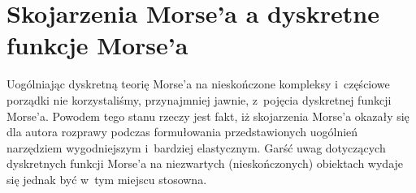 \begin{comment}
Dzięki twierdzeniu \ref{reversing_tw2} oczywisty jest następujący wniosek.
\begin{wn}
Jeśli na regularnym, lokalnie skończonym CW kompleksie $X$~zadane jest skojarzenie Morse'a $M$~takie, że zbiory $\mcC_M(\mP(X))$, \reflectbox{$\mcR$}$_M(\mP(X))$ są skończone, to przestrzeń $X$~ma kołnierzyk na zewnątrz.
\end{wn}
\end{comment}
\begin{comment}
\subsection{Dyskretne nierówności Morse'a w nieskończoności}
(do napisania)

Czy da się tym ograniczać liczby Bettiego w nieskończoności? (Choćby nawet przy założeniu, że wszystkie promienie w jedną stronę (a przynajmniej w danym końcu w jedną stronę -- może można założyć sobie po prostu, że mamy przestrzeń z jednym końcem. Wszak jeśli środek nas nie interesuje, to niewiele to zmienia.) Może zrobić na to osobną sekcję -- DMT a topologia w nieskończoności? Jak jest dobra przestrzeń, to brzeg Waldhausena jest równoważny odpowiedniemu collarowi. Mamy homologie collara, to mamy też brzegu. Czy można ogólniej? Odwracanie promieni -- przy skonczenie wielu promieniach mamy zarowno forward jak i reverse tame 
\end{comment}


\section{Skojarzenia Morse'a a dyskretne funkcje Morse'a}\label{skojarzenia-a-funkcje}
Uogólniając dyskretną teorię Morse'a na nieskończone kompleksy i~częściowe porządki nie korzystaliśmy, przynajmniej jawnie, z~pojęcia dyskretnej funkcji Morse'a. Powodem tego stanu rzeczy jest fakt, iż skojarzenia Morse'a okazały się dla autora rozprawy podczas formułowania przedstawionych uogólnień narzędziem wygodniejszym i~bardziej elastycznym. Garść uwag dotyczących dyskretnych funkcji Morse'a na niezwartych (nieskończonych) obiektach wydaje się jednak być w~tym miejscu stosowna.

